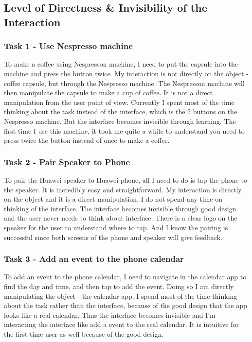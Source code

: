 \documentclass[
	letterpaper, %
]{jdf}
\begin{document}
\subsection{Level of Directness & Invisibility of the Interaction}
\subsubsection{Task 1 - Use Nespresso machine}
To make a coffee using Nespresson machine, I need to put the capsule into the machine and press the button twice. My interaction is not directly on the object - coffee capsule, but through the Nespresso machine. The Nespresson machine will then manipulate the capsule to make a cup of coffee. It is not a direct manipulation from the user point of view. Currently I spent most of the time thinking about the task instead of the interface, which is the 2 buttons on the Nespresso machine. But the interface becomes invisible through learning. The first time I use this machine, it took me quite a while to understand you need to press twice the button instead of once to make a coffee.

\subsubsection{Task 2 - Pair Speaker to Phone}
To pair the Huawei speaker to Huawei phone, all I need to do is tap the phone to the speaker. It is incredibly easy and straightforward. My interaction is directly on the object and it is a direct manipulation. I do not spend any time on thinking of the interface. The interface becomes invisible through good design and the user never needs to think about interface. There is a clear logo on the speaker for the user to understand where to tap. And I know the pairing is successful since both screens of the phone and speaker will give feedback.

\subsubsection{Task 3 - Add an event to the phone calendar}
To add an event to the phone calendar, I need to navigate in the calendar app to find the day and time, and then tap to add the event. Doing so I am directly manipulating the object - the calendar app. I spend most of the time thinking about the task rather than the interface, because of the good design that the app looks like a real calendar. Thus the interface becomes invisible and I'm interacting the interface like add a event to the real calendar. It is intuitive for the first-time user as well because of the good design. 
\end{document}
